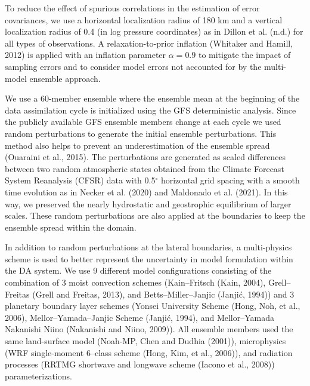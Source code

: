\documentclass[final,5p,times,twocolumn,authoryear]{elsarticle} %
\begin{document}
To reduce the effect of spurious correlations in the estimation of error covariances, we use a horizontal localization radius of 180 km and a vertical localization radius of 0.4 (in log pressure coordinates) as in Dillon et al. (n.d.) for all types of observations.
A relaxation-to-prior inflation (Whitaker and Hamill, 2012) is applied with an inflation parameter \(\alpha=0.9\) to mitigate the impact of sampling errors and to consider model errors not accounted for by the multi-model ensemble approach.

We use a 60-member ensemble where the ensemble mean at the beginning of the data assimilation cycle is initialized using the GFS deterministic analysis. Since the publicly available GFS ensemble members change at each cycle we used random perturbations to generate the initial ensemble perturbations. This method also helps to prevent an underestimation of the ensemble spread (Ouaraini et al., 2015). The perturbations are generated as scaled differences between two random atmospheric states obtained from the Climate Forecast System Reanalysis (CFSR) data with 0.5\(^{\circ}\) horizontal grid spacing with a smooth time evolution as in Necker et al. (2020) and Maldonado et al. (2021). In this way, we preserved the nearly hydrostatic and geostrophic equilibrium of larger scales. These random perturbations are also applied at the boundaries to keep the ensemble spread within the domain.

In addition to random perturbations at the lateral boundaries, a multi-physics scheme is used to better represent the uncertainty in model formulation within the DA system. We use 9 different model configurations consisting of the combination of 3 moist convection schemes (Kain--Fritsch (Kain, 2004), Grell--Freitas (Grell and Freitas, 2013), and Betts--Miller--Janjic (Janjić, 1994)) and 3 planetary boundary layer schemes (Yonsei University Scheme (Hong, Noh, et al., 2006), Mellor--Yamada--Janjic Scheme (Janjić, 1994), and Mellor--Yamada Nakanishi Niino (Nakanishi and Niino, 2009)). All ensemble members used the same land-surface model (Noah-MP, Chen and Dudhia (2001)), microphysics (WRF single-moment 6--class scheme (Hong, Kim, et al., 2006)), and radiation processes (RRTMG shortwave and longwave scheme (Iacono et al., 2008)) parameterizations.
\end{document}
